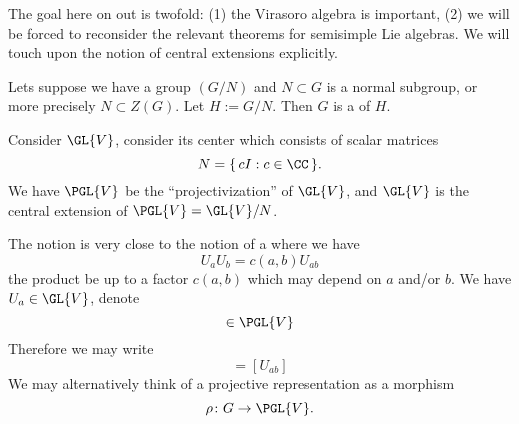 The goal here on out is twofold: (1) the Virasoro algebra is
important, (2) we will be forced to reconsider the relevant
theorems for semisimple Lie algebras. We will touch upon the
notion of central extensions explicitly.

\begin{defn}
Lets suppose we have a group $(G/N)$ and $N\subset G$ is a normal
subgroup, or more precisely $N\subset Z(G)$. Let $H:=G/N$. Then
$G$ is a  of $H$.
\end{defn}

\begin{ex}
Consider $\GL{V}$, consider its center which consists of scalar
matrices 
\begin{equation}
N = \{\, cI : c\in\CC\,\}.
\end{equation}
We have $\PGL{V}$ be the ``projectivization'' of $\GL{V}$, and
$\GL{V}$ is the central extension of $\PGL{V}=\GL{V}/N$.
\end{ex}

The notion is very close to the notion of a  where we have
\begin{equation}
U_{a}U_{b}=c(a,b)U_{ab}
\end{equation}
the product be up to a factor $c(a,b)$ which may depend on $a$
and/or $b$. We have $U_{a}\in\GL{V}$, denote
\begin{equation}
[U_{a}]\in\PGL{V}
\end{equation}
Therefore we may write
\begin{equation}
[U_{a}][U_{b}]=[U_{ab}]
\end{equation}
We may alternatively think of a projective representation as a
morphism
\begin{equation}
\rho\colon G\to\PGL{V}.
\end{equation}

